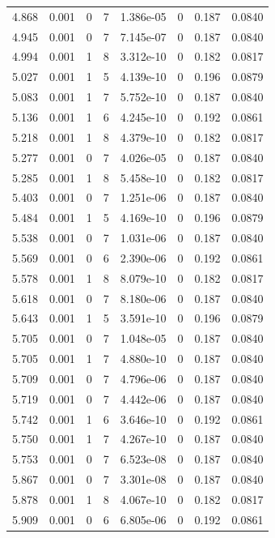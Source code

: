 \documentclass[preview]{standalone}
\begin{document}
{{{\begin{tabular}{L{1.2cm}C{1.2cm} C{0.3cm}C{0.5cm} C{1.4cm}C{1.4cm} C{1.4cm}C{1.4cm}}
  4.868  &  0.001  & 0     &  7 &  1.386e-05  & 0  & 0.187 &  0.0840   \\ 
  4.945  &  0.001  & 0     &  7 &  7.145e-07  & 0  & 0.187 &  0.0840   \\ 
  4.994  &  0.001  & 1     &  8 &  3.312e-10  & 0  & 0.182 &  0.0817   \\ 
  5.027  &  0.001  & 1     &  5 &  4.139e-10  & 0  & 0.196 &  0.0879   \\ 
  5.083  &  0.001  & 1     &  7 &  5.752e-10  & 0  & 0.187 &  0.0840   \\ 
  5.136  &  0.001  & 1     &  6 &  4.245e-10  & 0  & 0.192 &  0.0861   \\ 
  5.218  &  0.001  & 1     &  8 &  4.379e-10  & 0  & 0.182 &  0.0817   \\ 
  5.277  &  0.001  & 0     &  7 &  4.026e-05  & 0  & 0.187 &  0.0840   \\ 
  5.285  &  0.001  & 1     &  8 &  5.458e-10  & 0  & 0.182 &  0.0817   \\ 
  5.403  &  0.001  & 0     &  7 &  1.251e-06  & 0  & 0.187 &  0.0840   \\ 
  5.484  &  0.001  & 1     &  5 &  4.169e-10  & 0  & 0.196 &  0.0879   \\ 
  5.538  &  0.001  & 0     &  7 &  1.031e-06  & 0  & 0.187 &  0.0840   \\ 
  5.569  &  0.001  & 0     &  6 &  2.390e-06  & 0  & 0.192 &  0.0861   \\ 
  5.578  &  0.001  & 1     &  8 &  8.079e-10  & 0  & 0.182 &  0.0817   \\ 
  5.618  &  0.001  & 0     &  7 &  8.180e-06  & 0  & 0.187 &  0.0840   \\ 
  5.643  &  0.001  & 1     &  5 &  3.591e-10  & 0  & 0.196 &  0.0879   \\ 
  5.705  &  0.001  & 0     &  7 &  1.048e-05  & 0  & 0.187 &  0.0840   \\ 
  5.705  &  0.001  & 1     &  7 &  4.880e-10  & 0  & 0.187 &  0.0840   \\ 
  5.709  &  0.001  & 0     &  7 &  4.796e-06  & 0  & 0.187 &  0.0840   \\ 
  5.719  &  0.001  & 0     &  7 &  4.442e-06  & 0  & 0.187 &  0.0840   \\ 
  5.742  &  0.001  & 1     &  6 &  3.646e-10  & 0  & 0.192 &  0.0861   \\ 
  5.750  &  0.001  & 1     &  7 &  4.267e-10  & 0  & 0.187 &  0.0840   \\ 
  5.753  &  0.001  & 0     &  7 &  6.523e-08  & 0  & 0.187 &  0.0840   \\ 
  5.867  &  0.001  & 0     &  7 &  3.301e-08  & 0  & 0.187 &  0.0840   \\ 
  5.878  &  0.001  & 1     &  8 &  4.067e-10  & 0  & 0.182 &  0.0817   \\ 
  5.909  &  0.001  & 0     &  6 &  6.805e-06  & 0  & 0.192 &  0.0861   \\ 
\hline 
\end{tabular} 

}}}
\end{document}
